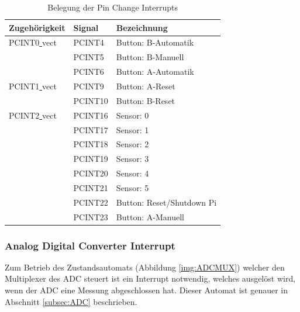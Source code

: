 \documentclass[a4paper, 11pt]{report}
\begin{document}
			\begin{table}[ht]
				\begin{tabular}{|l|l|l|}
					\hline
					Zugehörigkeit & Signal & Bezeichnung\\
					\hline
					\hline
					PCINT0\underline{ }vect & PCINT4 & Button: B-Automatik\\
					\hline
											& PCINT5 & Button: B-Manuell\\
					\hline
											& PCINT6 & Button: A-Automatik\\
					\hline
					\hline
					PCINT1\underline{ }vect & PCINT9 & Button: A-Reset\\
					\hline
											& PCINT10 & Button: B-Reset\\
					\hline
					\hline
					PCINT2\underline{ }vect & PCINT16 & Sensor: 0\\
					\hline
											& PCINT17 & Sensor: 1\\
					\hline
											& PCINT18 & Sensor: 2\\
					\hline
											& PCINT19 & Sensor: 3\\
					\hline
											& PCINT20 & Sensor: 4\\
					\hline
											& PCINT21 & Sensor: 5\\
					\hline
											& PCINT22 & Button: Reset/Shutdown Pi\\
					\hline
											& PCINT23 & Button: A-Manuell\\
					\hline
				\end{tabular}
				\caption{Belegung der Pin Change Interrupts}
				\label{tab:belegungpcint}
			\end{table}
			\subsubsection{Analog Digital Converter Interrupt}\label{subsubsec:ADCINT}
			Zum Betrieb des Zustandsautomats (Abbildung \ref{img:ADCMUX}) welcher den Multiplexer des ADC steuert ist ein Interrupt notwendig, welches ausgelöst wird, wenn der ADC eine Messung abgeschlossen hat. Dieser Automat ist genauer in Abschnitt \ref{subsec:ADC} beschrieben.

\end{document}
